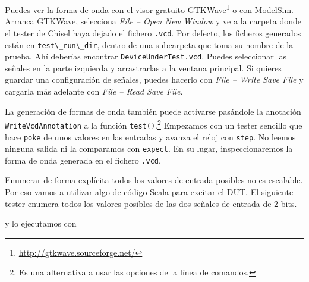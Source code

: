 \documentclass[%
    10pt,
    headinclude, footinclude=false,
    openright, %
    notitlepage,
    cleardoublepage=empty,
    headsepline,
    numbers=noenddot,
    bibliography=totoc, index=totoc,
    ]{scrbook}
\newcommand{\code}[1]{{\lstinline[basicstyle=\small\ttfamily]{#1}}}
\newcommand{\myref}[2]{\href{#1}{#2}}
\renewcommand{\myref}[2]{{#2}{\footnote{\url{#1}}}}
\begin{document}
Puedes ver la forma de onda con el visor gratuito
\myref{http://gtkwave.sourceforge.net/}{GTKWave} o con ModelSim.
Arranca GTKWave, selecciona \emph{File -- Open New Window} y ve a la
carpeta donde el tester de Chisel haya dejado el fichero \code{.vcd}. Por defecto, los ficheros generados
están en \code{test\_run\_dir}, dentro de una subcarpeta que toma su nombre de la prueba.
Ahí deberías encontrar \code{DeviceUnderTest.vcd}.
Puedes seleccionar las señales en la parte izquierda y arrastrarlas a la ventana principal.
Si quieres guardar una configuración de señales, puedes hacerlo con \emph{File -- Write Save File}
y cargarla más adelante con \emph{File -- Read Save File}.


La generación de formas de onda también puede activarse pasándole la anotación\\
\code{WriteVcdAnnotation} a la función \code{test()}.\footnote{Es una alternativa a
usar las opciones de la línea de comandos.}
Empezamos con un tester sencillo que hace \code{poke} de unos valores en las entradas y avanza
el reloj con \code{step}. No leemos ninguna salida ni la comparamos con \code{expect}.
En su lugar, inspeccionaremos la forma de onda generada en el fichero \code{.vcd}.



Enumerar de forma explícita todos los valores de entrada posibles no es escalable. Por eso vamos a utilizar
algo de código Scala para excitar el DUT. El siguiente tester enumera todos los valores posibles de
las dos señales de entrada de 2 bits.



\noindent y lo ejecutamos con
\end{document}
